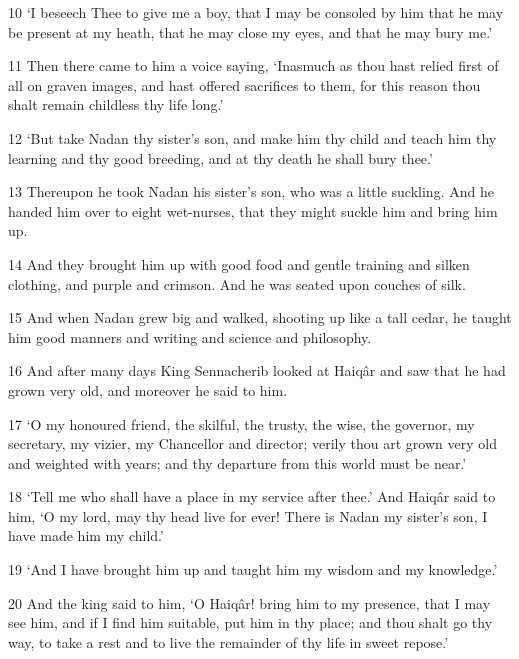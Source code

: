 \par 10 ‘I beseech Thee to give me a boy, that I may be consoled by him that he may be present at my heath, that he may close my eyes, and that he may bury me.’

\par 11 Then there came to him a voice saying, ‘Inasmuch as thou hast relied first of all on graven images, and hast offered sacrifices to them, for this reason thou shalt remain childless thy life long.’

\par 12 ‘But take Nadan thy sister's son, and make him thy child and teach him thy learning and thy good breeding, and at thy death he shall bury thee.’

\par 13 Thereupon he took Nadan his sister's son, who was a little suckling. And he handed him over to eight wet-nurses, that they might suckle him and bring him up.

\par 14 And they brought him up with good food and gentle training and silken clothing, and purple and crimson. And he was seated upon couches of silk.

\par 15 And when Nadan grew big and walked, shooting up like a tall cedar, he taught him good manners and writing and science and philosophy.

\par 16 And after many days King Sennacherib looked at Haiqâr and saw that he had grown very old, and moreover he said to him.

\par 17 ‘O my honoured friend, the skilful, the trusty, the wise, the governor, my secretary, my vizier, my Chancellor and director; verily thou art grown very old and weighted with years; and thy departure from this world must be near.’

\par 18 ‘Tell me who shall have a place in my service after thee.’ And Haiqâr said to him, ‘O my lord, may thy head live for ever! There is Nadan my sister's son, I have made him my child.’

\par 19 ‘And I have brought him up and taught him my wisdom and my knowledge.’

\par 20 And the king said to him, ‘O Haiqâr! bring him to my presence, that I may see him, and if I find him suitable, put him in thy place; and thou shalt go thy way, to take a rest and to live the remainder of thy life in sweet repose.’

